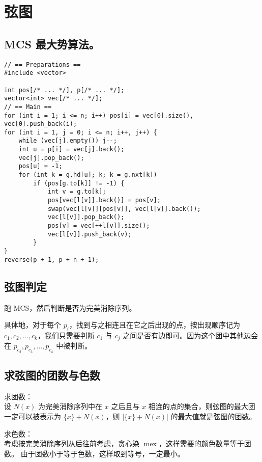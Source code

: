 \section{弦图}

\subsection{MCS 最大势算法。}

\begin{verbatim}
// == Preparations ==
#include <vector>

int pos[/* ... */], p[/* ... */];
vector<int> vec[/* ... */];
// == Main ==
for (int i = 1; i <= n; i++) pos[i] = vec[0].size(), vec[0].push_back(i);
for (int i = 1, j = 0; i <= n; i++, j++) {
    while (vec[j].empty()) j--;
    int u = p[i] = vec[j].back();
    vec[j].pop_back();
    pos[u] = -1;
    for (int k = g.hd[u]; k; k = g.nxt[k])
        if (pos[g.to[k]] != -1) {
            int v = g.to[k];
            pos[vec[l[v]].back()] = pos[v];
            swap(vec[l[v]][pos[v]], vec[l[v]].back());
            vec[l[v]].pop_back();
            pos[v] = vec[++l[v]].size();
            vec[l[v]].push_back(v);
        }
}
reverse(p + 1, p + n + 1);
\end{verbatim}

\subsection{弦图判定}

跑 MCS，然后判断是否为完美消除序列。

具体地，对于每个 $p _ i$，找到与之相连且在它之后出现的点，按出现顺序记为 $c _ 1, c _ 2, \ldots, c _ k$，我们只需要判断 $c _ 1$ 与 $c _ j$ 之间是否有边即可。因为这个团中其他边会在 $p _ {c _ 2}, p _ {c _ 3}, \ldots, p _ {c _ k}$ 中被判断。

\subsection{求弦图的团数与色数}

求团数：\\
设 $N(x)$ 为完美消除序列中在 $x$ 之后且与 $x$ 相连的点的集合，则弦图的最大团一定可以被表示为 $\{x\} + N(x)$，则 $|\{x\} + N(x)|$ 的最大值就是弦图的团数。

求色数：\\
考虑按完美消除序列从后往前考虑，贪心染 $\operatorname{mex}$，这样需要的颜色数量等于团数。  
由于团数小于等于色数，这样取到等号，一定最小。

